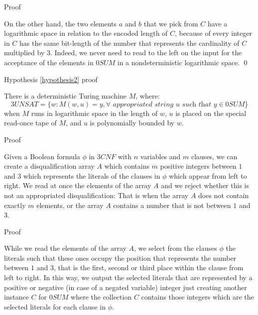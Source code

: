 \documentclass[11pt]{beamer}
\begin{document}
\begin{frame}{Proof}

On the other hand, the two elements $a$ and $b$ that we pick from $C$ have a logarithmic space in relation to the encoded length of $C$, because of every integer in $C$ has the same bit-length of the number that represents the cardinality of $C$ multiplied by $3$. Indeed, we never need to read to the left on the input for the acceptance of the elements in $0SUM$ in a nondeterministic logarithmic space. \qed

\end{frame}

\begin{frame}{Hypothesis \ref{hypothesis2} proof}

\begin{theorem}
\label{demonstration}
There is a deterministic Turing machine $M$, where:
\[3UNSAT = \{w: M(w, u) = y, \forall \textit{ appropriated string } u \textit{ such that } y \in 0SUM\}\]
when $M$ runs in logarithmic space in the length of $w$, $u$ is placed on the special read-once tape of $M$, and $u$ is polynomially bounded by $w$.
\end{theorem}

\end{frame}

\begin{frame}{Proof}

Given a Boolean formula $\phi$ in $3CNF$ with $n$ variables and $m$ clauses, we can create a disqualification array $A$ which contains $m$ positive integers between $1$ and $3$ which represents the literals of the clauses in $\phi$ which appear from left to right. We read at once the elements of the array $A$ and we reject whether this is not an appropriated disqualification: That is when the array $A$ does not contain exactly $m$ elements, or the array $A$ contains a number that is not between $1$ and $3$.

\end{frame}

\begin{frame}{Proof}

While we read the elements of the array $A$, we select from the clauses $\phi$ the literals such that these ones occupy the position that represents the number between $1$ and $3$, that is the first, second or third place within the clause from left to right. In this way, we output the selected literals that are represented by a positive or negative (in case of a negated variable) integer just creating another instance $C$ for $0SUM$ where the collection $C$ contains those integers which are the selected literals for each clause in $\phi$.

\end{frame}
\end{document}
